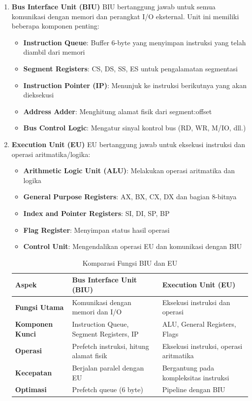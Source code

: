 \begin{enumerate}
\item \textbf{Bus Interface Unit (BIU)}
BIU bertanggung jawab untuk semua komunikasi dengan memori dan perangkat I/O eksternal. Unit ini memiliki beberapa komponen penting:

\begin{itemize}
    \item \textbf{Instruction Queue}: Buffer 6-byte yang menyimpan instruksi yang telah diambil dari memori
    \item \textbf{Segment Registers}: CS, DS, SS, ES untuk pengalamatan segmentasi
    \item \textbf{Instruction Pointer (IP)}: Menunjuk ke instruksi berikutnya yang akan dieksekusi
    \item \textbf{Address Adder}: Menghitung alamat fisik dari segment:offset
    \item \textbf{Bus Control Logic}: Mengatur sinyal kontrol bus (RD, WR, M/IO, dll.)
\end{itemize}

\item \textbf{Execution Unit (EU)}
EU bertanggung jawab untuk eksekusi instruksi dan operasi aritmatika/logika:

\begin{itemize}
    \item \textbf{Arithmetic Logic Unit (ALU)}: Melakukan operasi aritmatika dan logika
    \item \textbf{General Purpose Registers}: AX, BX, CX, DX dan bagian 8-bitnya
    \item \textbf{Index and Pointer Registers}: SI, DI, SP, BP
    \item \textbf{Flag Register}: Menyimpan status hasil operasi
    \item \textbf{Control Unit}: Mengendalikan operasi EU dan komunikasi dengan BIU
\end{itemize}

\begin{table}[h]
\centering
\caption{Komparasi Fungsi BIU dan EU}
\begin{tabular}{|p{3cm}|p{6cm}|p{6cm}|}
\hline
\textbf{Aspek} & \textbf{Bus Interface Unit (BIU)} & \textbf{Execution Unit (EU)} \\
\hline
\textbf{Fungsi Utama} & Komunikasi dengan memori dan I/O & Eksekusi instruksi dan operasi \\
\hline
\textbf{Komponen Kunci} & Instruction Queue, Segment Registers, IP & ALU, General Registers, Flags \\
\hline
\textbf{Operasi} & Prefetch instruksi, hitung alamat fisik & Eksekusi instruksi, operasi aritmatika \\
\hline
\textbf{Kecepatan} & Berjalan paralel dengan EU & Bergantung pada kompleksitas instruksi \\
\hline
\textbf{Optimasi} & Prefetch queue (6 byte) & Pipeline dengan BIU \\
\hline
\end{tabular}
\label{tab:biu-eu-comparison}
\end{table}


\end{enumerate}
